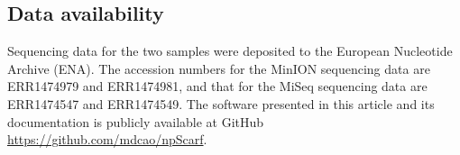 \subsection{Data availability}
Sequencing data for the two \kp{} samples were deposited to the
European Nucleotide Archive (ENA). The accession numbers for the MinION sequencing data are
ERR1474979 and ERR1474981, and that for the MiSeq sequencing data are 
ERR1474547 and ERR1474549.
The software presented in this article and its documentation is publicly
available at GitHub \url{https://github.com/mdcao/npScarf}.


%
%


